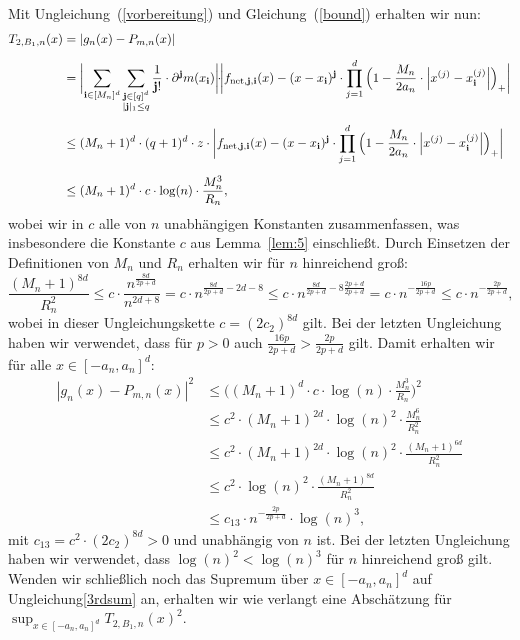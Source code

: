 Mit Ungleichung~(\ref{vorbereitung}) und Gleichung~(\ref{bound}) erhalten wir nun:
\begin{equation}
\label{1stsum}
\begin{split}
T_{2,B_1,n}(x) & = |g_n(x) - P_{m,n}(x)| \\[0.5em]
& = \bigg|\! \sum_{\mathbf{i} \in [M_n]^d} \sum_{\substack{ \mathbf{j} \in [q]^d \\ |\mathbf{j}|_1 \leq q}} \frac{1}{\mathbf{j}!} \cdot \partial^{\mathbf{j}} m (x_{\mathbf{i}}) \bigg|\!\! \cdot \!\!\bigg| f_{\mathrm{net},\mathbf{j},\mathbf{i}}(x) - (x - x_{\mathbf{i}})^{\mathbf{j}} \cdot \prod_{j = 1}^d\Big(1 - \frac{M_n}{2a_n} \cdot \Big|x^{(j)} - x_{\mathbf{i}}^{(j)}\Big|\Big)_+ \bigg| \\[0.5em]
& \leq (M_n + 1)^d \cdot (q + 1)^d \cdot z \cdot \bigg| f_{\mathrm{net},\mathbf{j},\mathbf{i}}(x) - (x - x_{\mathbf{i}})^{\mathbf{j}} \cdot \prod_{j = 1}^d\Big(1 - \frac{M_n}{2a_n} \cdot \Big|x^{(j)} - x_{\mathbf{i}}^{(j)}\Big|\Big)_+ \bigg| \\[0.5em]
& \leq  (M_n + 1)^d \cdot c\cdot \log(n) \cdot \frac{M_n^3}{R_n},
\end{split}
\end{equation}
wobei wir in $c$ alle von $n$ unabhängigen Konstanten zusammenfassen, was insbesondere die Konstante $c$ aus Lemma~\ref{lem:5} einschließt.
Durch Einsetzen der Definitionen von $M_n$ und $R_n$ erhalten wir für $n$ hinreichend groß:
$$
\frac{(M_n + 1)^{8d}}{R_n^2} \leq c \cdot \frac{n^{\frac{8d}{2p + d}}}{n^{2d + 8}} = c \cdot n^{\frac{8d}{2p + d} - 2d -8} \leq c \cdot n^{\frac{8d}{2p + d}  -8\frac{2p + d}{2p + d}} = c \cdot n^{-\frac{16p}{2p + d}} \leq c \cdot n^{-\frac{2p}{2p + d}},
$$
wobei in dieser Ungleichungskette $c = (2c_2)^{8d}$ gilt.
Bei der letzten Ungleichung haben wir verwendet, dass für $p > 0$ auch $\frac{16p}{2p + d} > \frac{2p}{2p + d}$ gilt. Damit erhalten wir für alle $x \in [-a_n,a_n]^d$:
\begin{equation}
\label{3rdsum}
\begin{split}
|g_n(x) - P_{m,n}(x)|^2 & \leq \bigg((M_n + 1)^d \cdot c \cdot \log(n) \cdot \frac{M_n^3}{R_n}\bigg)^2 \\[0.5em]
& \leq c^2 \cdot (M_n + 1)^{2d} \cdot \log(n)^2 \cdot \frac{M_n^6}{R_n^2} \\[0.5em]
& \leq  c^2 \cdot (M_n + 1)^{2d} \cdot \log(n)^2 \cdot \frac{(M_n + 1)^{6d}}{R_n^2} \\[0.5em]
& \leq  c^2 \cdot \log(n)^2 \cdot \frac{(M_n + 1)^{8d}}{R_n^2} \\[0.5em]
& \leq c_{13} \cdot n^{-\frac{2p}{2p + d}} \cdot \log(n)^3,
\end{split}
\end{equation}
mit $c_{13} = c^2 \cdot (2c_2)^{8d} > 0$ und unabhängig von $n$ ist. Bei der letzten Ungleichung haben wir verwendet, dass $\log(n)^2 < \log(n)^3$ für $n$ hinreichend groß gilt. Wenden wir schließlich noch das Supremum über $x \in [-a_n, a_n]^d$ auf Ungleichung\eqref{3rdsum} an, erhalten wir wie verlangt eine Abschätzung für $\sup_{x \in [-a_n, a_n]^d} T_{2,B_1,n}(x)^2$.

